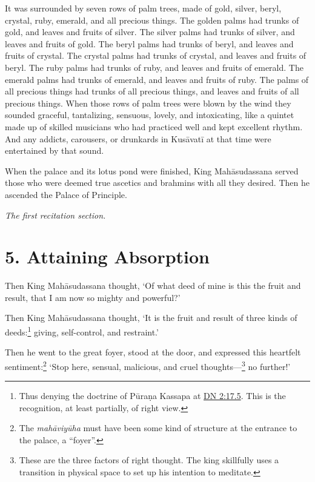 \documentclass[12pt,openany]{book}%
\newcommand*{\scendsection}[1]{\begin{Center}\begin{small}\textit{#1}\end{small}\end{Center}\addvspace{1em}}
\begin{document}
It was surrounded by seven rows of palm trees, made of gold, silver, beryl, crystal, ruby, emerald, and all precious things. The golden palms had trunks of gold, and leaves and fruits of silver. The silver palms had trunks of silver, and leaves and fruits of gold. The beryl palms had trunks of beryl, and leaves and fruits of crystal. The crystal palms had trunks of crystal, and leaves and fruits of beryl. The ruby palms had trunks of ruby, and leaves and fruits of emerald. The emerald palms had trunks of emerald, and leaves and fruits of ruby. The palms of all precious things had trunks of all precious things, and leaves and fruits of all precious things. When those rows of palm trees were blown by the wind they sounded graceful, tantalizing, sensuous, lovely, and intoxicating, like a quintet made up of skilled musicians who had practiced well and kept excellent rhythm. And any addicts, carousers, or drunkards in \textsanskrit{Kusāvatī} at that time were entertained by that sound. 

When the palace and its lotus pond were finished, King \textsanskrit{Mahāsudassana} served those who were deemed true ascetics and brahmins with all they desired. Then he ascended the Palace of Principle. 

\scendsection{The first recitation section. }

\section*{5. Attaining Absorption }

Then King \textsanskrit{Mahāsudassana} thought, ‘Of what deed of mine is this the fruit and result, that I am now so mighty and powerful?’ 

Then King \textsanskrit{Mahāsudassana} thought, ‘It is the fruit and result of three kinds of deeds:\footnote{Thus denying the doctrine of \textsanskrit{Pūraṇa} Kassapa at \href{https://suttacentral.net/dn2/en/sujato\#17.5}{DN 2:17.5}. This is the recognition, at least partially, of right view. } giving, self-control, and restraint.’ 

Then he went to the great foyer, stood at the door, and expressed this heartfelt sentiment:\footnote{The \textit{\textsanskrit{mahāviyūha}} must have been some kind of structure at the entrance to the palace, a “foyer”. } ‘Stop here, sensual, malicious, and cruel thoughts—\footnote{These are the three factors of right thought. The king skillfully uses a transition in physical space to set up his intention to meditate. } no further!’ 
\end{document}
